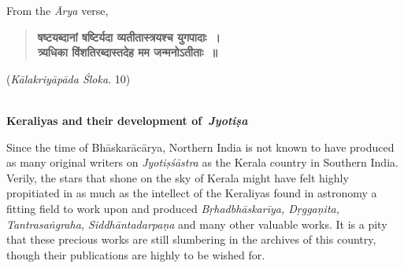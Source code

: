 \documentclass[11pt, openany]{book}
\begin{document}
\newpage
\thispagestyle{empty}

\begin{center}{2}\end{center}

{\en From the \emph{Ārya} verse,}

\begin{quote}
\textbf{षष्टयब्दानां षष्टिर्यदा व्यतीतास्त्रयश्च युगपादाः~।\\
त्र्यधिका विंशतिरब्दास्तदेह मम जन्मनोऽतीताः~॥}
\end{quote}
\vspace{-3mm}
\hspace{7.5cm}(\emph{\en Kālakriyāpāda Śloka}. 10)\\

\\

\begin{minipage}[t]{0.15\textwidth}
	\vspace{2cm}
\textbf{{\en Keraliyas and their development of~\emph{Jyotiṣa}}}
\end{minipage} 
\begin{minipage}[t]{0.55\textwidth} 
\vspace{-4mm}
{\en Since the time of Bhāskarācārya, Northern India is not known to have produced as many original writers on \emph{Jyotiṣśāstra} as the Kerala country in Southern India. Verily, the stars that shone on the sky of Kerala might have felt highly propitiated in as much as the intellect of the Keraliyas found in astronomy a fitting field to work upon and produced \emph{Bṛhadbhāskarīya, Dṛggaṇita, Tantrasaṅgraha, Siddhāntadarpaṇa} and many other valuable works. It is a pity that these precious works are still slumbering in the archives of this country, though their publications are highly to be wished for.}
\end{minipage} \\
\end{document}
